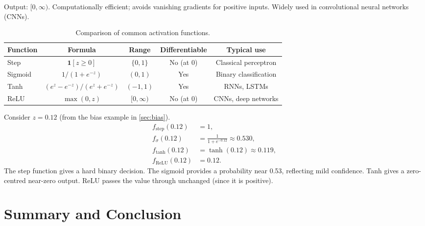 \documentclass[12pt,a4paper]{article}
\begin{document}
Output: $[0, \infty)$.  Computationally efficient; avoids vanishing
gradients for positive inputs.  Widely used in convolutional neural
networks (CNNs).

\begin{table}[ht]
\centering
\caption{Comparison of common activation functions.}
\label{tab:activations}
\begin{tabular}{lcccc}
\toprule
\textbf{Function} & \textbf{Formula} & \textbf{Range} &
\textbf{Differentiable} & \textbf{Typical use} \\
\midrule
Step     & $\mathbf{1}[z \geq 0]$             & $\{0,1\}$   & No (at 0) & Classical perceptron \\
Sigmoid  & $1/(1+e^{-z})$                      & $(0,1)$     & Yes       & Binary classification \\
Tanh     & $(e^z - e^{-z})/(e^z + e^{-z})$    & $(-1,1)$    & Yes       & RNNs, LSTMs \\
ReLU     & $\max(0, z)$                        & $[0,\infty)$& No (at 0) & CNNs, deep networks \\
\bottomrule
\end{tabular}
\end{table}

\begin{example}[title=Example -- Sigmoid vs.\ Step on the Same Input]
Consider $z = 0.12$ (from the bias example in \cref{sec:bias}).
\begin{align*}
  f_{\text{step}}(0.12)   &= 1, \\
  f_{\sigma}(0.12)         &= \frac{1}{1 + e^{-0.12}} \approx 0.530, \\
  f_{\tanh}(0.12)          &= \tanh(0.12) \approx 0.119, \\
  f_{\text{ReLU}}(0.12)   &= 0.12.
\end{align*}
The step function gives a hard binary decision.  The sigmoid provides a
probability near 0.53, reflecting mild confidence.  Tanh gives a
zero-centred near-zero output.  ReLU passes the value through unchanged
(since it is positive).
\end{example}

\section{Summary and Conclusion}
\label{sec:conclusion}
\end{document}
